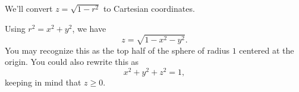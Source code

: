 \documentclass{ximera}
\begin{document}
\begin{example}
We'll convert $z = \sqrt{1-r^2}$ to Cartesian coordinates.

Using $r^2 = x^2 + y^2$, we have
\[
z = \sqrt{1-x^2-y^2}.
\]
You may recognize this as the top half of the sphere of radius $1$ centered at the origin. You could also rewrite this as
\[
x^2+y^2+z^2=1,
\]
keeping in mind that $z\geq 0$.

\begin{image}
\end{image}

\end{example}
\end{document}
